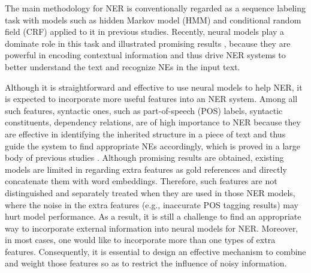 \documentclass[11pt,a4paper]{article}
\begin{document}
The main methodology for NER is conventionally regarded as a sequence labeling task with models such as hidden Markov model (HMM) \cite{DBLP:conf/anlp/BikelMSW97} and conditional random field (CRF) \cite{DBLP:conf/conll/McCallum003} applied to it in previous studies.
Recently, neural models play a dominate role in this task and illustrated promising results \cite{DBLP:journals/jmlr/CollobertWBKKK11,DBLP:journals/corr/HuangXY15,DBLP:conf/naacl/LampleBSKD16,DBLP:conf/emnlp/StrubellVBM17,DBLP:conf/coling/YadavB18,DBLP:conf/aaai/ChenLDLZK19,DBLP:conf/emnlp/JieL19,DBLP:conf/acl/LiuMZXCZ19,DBLP:conf/emnlp/BaevskiELZA19}, 
because they are powerful in encoding contextual information and thus drive NER systems to better understand the text and recognize NEs in the input text.
Although it is straightforward and effective to use neural models
to help NER, it is expected to incorporate more useful features into an NER system.
Among all such features, syntactic ones, such as part-of-speech (POS) labels, syntactic constituents, dependency relations, are of high importance to NER because they are effective in identifying the inherited structure in a piece of text and thus guide the system to find appropriate NEs accordingly, which is proved in a large body of previous studies \cite{DBLP:conf/uai/McCallum03,DBLP:conf/emnlp/LiDWCM17,DBLP:journals/bioinformatics/LuoYYZWLW18,DBLP:journals/bioinformatics/DangLNV18,DBLP:conf/emnlp/JieL19}.
Although promising results are obtained, existing models are limited in regarding extra features as gold references and directly concatenate them with word embeddings.
Therefore,
such features are not distinguished and separately treated when they are used in those NER models, where the noise in the extra features (e.g., inaccurate POS tagging results) may hurt model performance.
As a result,
it is still a challenge to find an appropriate way to incorporate external information into neural models for NER.
Moreover, in most cases, one would like to incorporate more than one types of extra features. 
Consequently, it is essential to design an effective mechanism to combine and weight those features so as to restrict the influence of noisy information.
\end{document}

